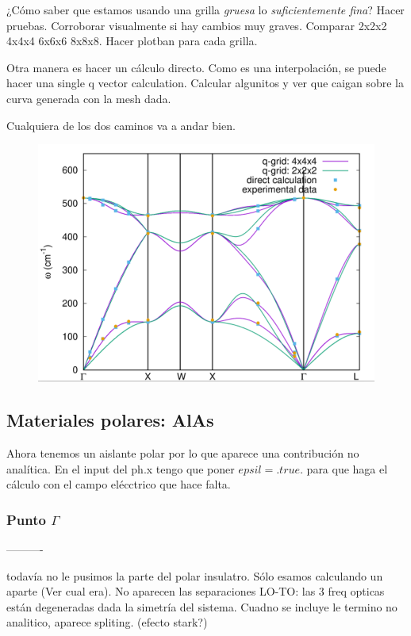   ¿Cómo saber que estamos usando una grilla \emph{gruesa} lo \emph{suficientemente fina}? Hacer pruebas. Corroborar visualmente si hay cambios muy graves. Comparar 2x2x2 4x4x4 6x6x6 8x8x8. Hacer plotban para cada grilla.

  Otra manera es hacer un cálculo directo. Como es una interpolación, se puede hacer una single q vector calculation. Calcular algunitos y ver que caigan sobre la curva generada con la mesh dada.

  Cualquiera de los dos caminos va a andar bien.
  \begin{figure}[H]
    \centering
    \includegraphics[scale = 0.35]{figs/D5/Si_disp.png}
  \end{figure}

\subsection{Materiales polares: AlAs}

  Ahora tenemos un aislante polar por lo que aparece una contribución no analítica. En el input del ph.x tengo que poner $epsil = .true.$ para que haga el cálculo con el campo elécctrico que hace falta.

\subsubsection{Punto $\Gamma$}

  ----------

todavía no le pusimos la parte del polar insulatro. Sólo esamos calculando un aparte (Ver cual era). No aparecen las separaciones LO-TO: las 3 freq opticas están degeneradas dada la simetría del sistema. Cuadno se incluye le termino no analitico, aparece spliting. (efecto stark?)

